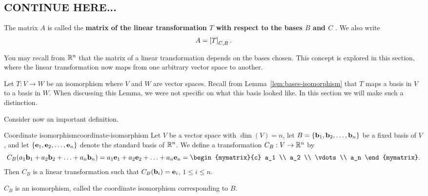 \subsection{CONTINUE HERE...}


The matrix $A$ is called the \textbf{matrix of the linear
  transformation\/ $T$ with respect to the bases $B$ and $C$}%
%
.
We also write
\begin{equation*}
  A = \left[T\right]_{C,B}.
\end{equation*}


You may recall from $\mathbb{R}^n$ that the matrix of a linear transformation
depends on the bases chosen. This concept is explored in this section,
where the linear transformation now maps from one arbitrary vector
space to another.

Let $T: V \to W$ be an isomorphism where $V$ and $W$ are vector
spaces. Recall from Lemma~\ref{lem:bases-isomorphism} that $T$ maps a
basis in $V$ to a basis in $W$. When discussing this Lemma, we were
not specific on what this basis looked like. In this section we will
make such a distinction.

Consider now an important definition.

\begin{definition}{Coordinate isomorphism}{coordinate-isomorphism}
  Let $V$ be a vector space with $\dim(V)=n$, let
  $B=\left\{\mbox{\bf b}_1, \mbox{\bf b}_2, \ldots, \mbox{\bf b}_n\right\}$ be a fixed
  basis of $V$, and let
  $\left\{\mbox{\bf e}_1, \mbox{\bf e}_2, \ldots, \mbox{\bf e}_n\right\}$ denote the
  standard basis of $\mathbb{R}^n$.  We define a transformation $C_B:V\to\mathbb{R}^n$
  by
  \begin{equation*}
    C_B(a_1\vect{b}_1 + a_2\vect{b}_2 + \ldots + a_n\vect{b}_n)
    =
    a_1\vect{e}_1 + a_2\vect{e}_2 + \ldots + a_n\vect{e}_n
    =
    \begin{mymatrix}{c} a_1 \\ a_2 \\ \vdots \\ a_n
    \end{mymatrix}.
  \end{equation*}
  Then $C_B$ is a linear transformation
  such that
  $C_B(\mbox{\bf b}_i)=\mbox{\bf e}_i$, $1\leq i\leq n$.

  $C_B$ is an isomorphism, called
  the coordinate isomorphism corresponding to $B$.
\end{definition}

